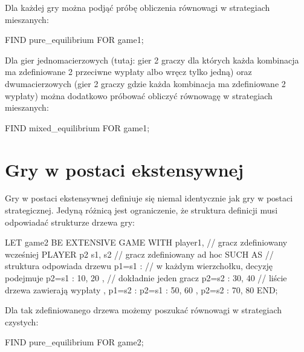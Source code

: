 \documentclass[polish]{standalone}
\begin{document}
Dla każdej gry można podjąć próbę obliczenia równowagi w strategiach mieszanych:

\begin{code}
FIND pure_equilibrium FOR game1;
\end{code}

Dla gier jednomacierzowych (tutaj: gier 2 graczy dla których każda kombinacja ma zdefiniowane 2 przeciwne wypłaty albo
wręcz tylko jedną) oraz dwumacierzowych (gier 2 graczy gdzie każda kombinacja ma zdefiniowane 2 wypłaty) można dodatkowo
próbować obliczyć równowagę w strategiach mieszanych:

\begin{code}
FIND mixed_equilibrium FOR game1;
\end{code}

\section{Gry w postaci ekstensywnej}

Gry w postaci ekstensywnej definiuje się niemal identycznie jak gry w postaci strategicznej. Jedyną różnicą jest
ograniczenie, że struktura definicji musi odpowiadać strukturze drzewa gry:

\begin{code}
LET game2 BE
  EXTENSIVE GAME
  WITH
    player1, // gracz zdefiniowany wcześniej
    PLAYER p2 { s1, s2 } // gracz zdefiniowany ad hoc
  SUCH AS                 // struktura odpowiada drzewu
    { p1=s1 :             // w każdym wierzchołku, decyzję podejmuje
      { p2=s1 : 10, 20 }, // dokładnie jeden gracz
      { p2=s2 : 30, 40 }  // liście drzewa zawierają wypłaty
    },
    { p1=s2 :
      { p2=s1 : 50, 60 },
      { p2=s2 : 70, 80 }
    }
  END;
\end{code}

Dla tak zdefiniowanego drzewa możemy poszukać równowagi w strategiach czystych:

\begin{code}
FIND pure_equilibrium FOR game2;
\end{code}
\end{document}
